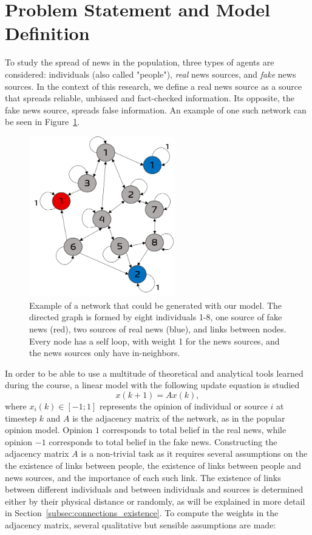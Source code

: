 \section{Problem Statement and Model Definition}
\label{sec:mathematical}
To study the spread of news in the population, three types of agents are considered: individuals (also called "people"), \textit{real} news sources, and \textit{fake} news sources. In the context of this research, we define a real news source as a source that spreads reliable, unbiased and fact-checked information. Its opposite, the fake news source, spreads false information. An example of one such network can be seen in Figure~\ref{pics:network_example}.

\begin{figure}
\centering
\includegraphics[width=2.5in]{Figures/network_example.png}
\caption{Example of a network that could be generated with our model. The directed graph is formed by eight individuals 1-8, one source of fake news (red), two sources of real news (blue), and links between nodes. Every node has a self loop, with weight 1 for the news sources, and the news sources only have in-neighbors.}
\label{pics:network_example}
\end{figure}
In order to be able to use a multitude of theoretical and analytical tools learned during the course, a linear model with the following update equation is studied
\begin{equation}
\label{eq:model}
x(k+1) = A x(k),
\end{equation}
where $x_i(k) \in [-1;1]$ represents the opinion of individual or source  $i$ at timestep $k$ and $A$ is the adjacency matrix of the network, as in the popular opinion model\cite{Friedkin1990}. Opinion $1$ corresponds to total belief in the real news, while opinion $-1$ corresponds to total belief in the fake news.
Constructing the adjacency matrix $A$ is a non-trivial task as it requires several assumptions on the the existence of links between people, the existence of links between people and news sources, and the importance of each such link.
The existence of links between different individuals and between individuals and sources is determined either by their physical distance or randomly, as will be explained in more detail in Section~\ref{subsec:connections_existence}.
To compute the weights in the adjacency matrix, several qualitative but sensible assumptions are made:

